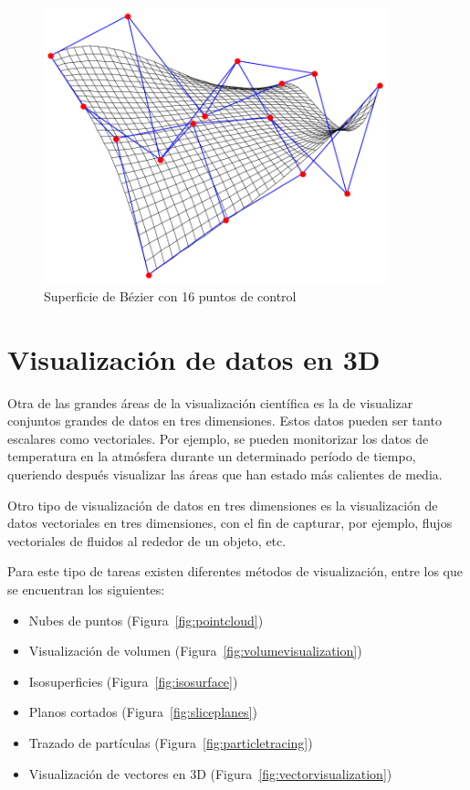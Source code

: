 \begin{figure}[t]
	\centering	
	\includegraphics[height=8cm]{figures/beziersurface.png}
	\caption{Superficie de Bézier con 16 puntos de control}
	\label{fig:beziersurface}
\end{figure}

\section{Visualización de datos en 3D}
\label{ref:cloud}

Otra de las grandes áreas de la visualización científica es la de visualizar
conjuntos grandes de datos en tres dimensiones. Estos datos pueden ser tanto
escalares como vectoriales. Por ejemplo, se pueden monitorizar los datos de
temperatura en la atmósfera durante un determinado período de tiempo, queriendo
después visualizar las áreas que han estado más calientes de media. 

Otro tipo de visualización de datos en tres dimensiones es la visualización de
datos vectoriales en tres dimensiones, con el fin de capturar, por ejemplo,
flujos vectoriales de fluidos al rededor de un objeto, etc.

Para este tipo de tareas existen diferentes métodos de visualización, entre los
que se encuentran los siguientes:

\begin{itemize}
	\item Nubes de puntos (Figura~\ref{fig:pointcloud})
	\item Visualización de volumen (Figura~\ref{fig:volumevisualization})
	\item Isosuperficies (Figura~\ref{fig:isosurface})
	\item Planos cortados (Figura~\ref{fig:sliceplanes})
	\item Trazado de partículas (Figura~\ref{fig:particletracing})
	\item Visualización de vectores en 3D  (Figura~\ref{fig:vectorvisualization})
\end{itemize}

